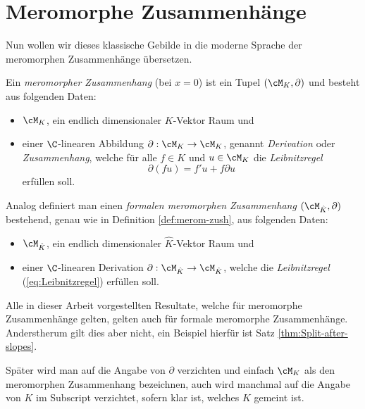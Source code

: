 \section{Meromorphe Zusammenhänge}
Nun wollen wir dieses klassische Gebilde in die moderne Sprache der
meromorphen Zusammenhänge übersetzen.
\begin{defn} \label{def:merom-zush}
Ein \emph{meromorpher Zusammenhang} (bei $x=0$) ist ein Tupel
$(\cM_K,\partial)$ und besteht aus folgenden Daten:
\begin{itemize}
\item $\cM_K$, ein endlich dimensionaler $K$-Vektor Raum und
\item einer $\C$-linearen Abbildung $\partial:\cM_K\rightarrow \cM_K$,
genannt \emph{Derivation} oder \emph{Zusammenhang}, welche für alle $f\in K$
und $u\in \cM_K$ die \emph{Leibnitzregel}
\begin{equation}\label{eq:Leibnitzregel}
\partial(fu)=f'u+f\partial u %
\end{equation}
erfüllen soll.
\end{itemize}
\end{defn}
\begin{bem} %
Analog definiert man einen \emph{formalen meromorphen Zusammenhang}
$(\cM_{\hat K},\partial)$ bestehend, genau wie in Definition
\ref{def:merom-zush}, aus folgenden Daten:
\begin{itemize}
\item $\cM_{\hat K}$, ein endlich dimensionaler $\hat K$-Vektor Raum und
\item einer $\C$-linearen Derivation $\partial:\cM_{\hat K}\rightarrow
\cM_{\hat K}$, welche die \emph{Leibnitzregel} (\ref{eq:Leibnitzregel})
erfüllen soll.
\end{itemize}
\end{bem}

\begin{bem}
Alle in dieser Arbeit vorgestellten Resultate, welche für meromorphe
Zusammenhänge gelten, gelten auch für formale meromorphe Zusammenhänge.
Anderstherum gilt dies aber nicht, ein Beispiel hierfür ist
Satz \ref{thm:Split-after-slopes}.
\end{bem}
\begin{bem}
Später wird man auf die Angabe von $\partial$ verzichten und einfach
$\cM_K$ als den meromorphen Zusammenhang bezeichnen, auch wird manchmal auf die
Angabe von $K$ im Subscript verzichtet, sofern klar ist, welches $K$ gemeint
ist.
\end{bem}

